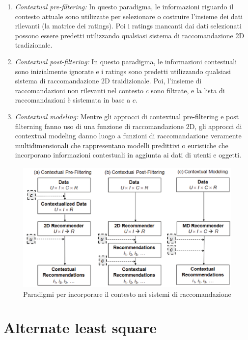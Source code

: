 \documentclass[12pt,italian]{report}
\begin{document}
\begin{enumerate}
 \item \textit{Contextual pre-filtering:} In questo paradigma, le informazioni riguardo il contesto attuale sono utilizzate per selezionare o costruire l'insieme dei dati rilevanti (la matrice dei ratings). Poi i ratings mancanti dai dati selezionati possono essere predetti utilizzando qualsiasi sistema di raccomandazione 2D tradizionale.
 \item \textit{Contextual post-filtering:} In questo paradigma, le informazioni contestuali sono inizialmente ignorate e i ratings sono predetti utilizzando qualsiasi sistema di raccomandazione 2D traidizionale. Poi, l'insieme di raccomandazioni non rilevanti nel contesto $c$ sono filtrate, e la lista di raccomandazioni è sistemata in base a $c$.
 \item  \textit{Contextual modeling:} Mentre gli approcci di contextual pre-filtering e post filterning fanno uso di una funzione di raccomandazione 2D, gli approcci di contextual modeling danno luogo a funzioni di raccomandazione veramente multidimensionali che rappresentano modelli predittivi o euristiche che incorporano informazioni contestuali in aggiunta ai dati di utenti e oggetti.
\end{enumerate}

\begin{figure}
  \includegraphics[width=\linewidth]{immagini/paradigm_for_context_inclusion.png}
  \caption{Paradigmi per incorporare il contesto nei sistemi di raccomandazione}
  \label{fig:context-paradigm}
\end{figure}

\section{Alternate least square}
\end{document}
